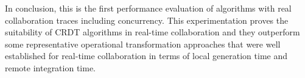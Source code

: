 In conclusion, this is the first performance evaluation of algorithms with real collaboration traces including concurrency. This experimentation proves the suitability of CRDT algorithms in real-time collaboration and they outperform some representative operational transformation approaches that were well established for real-time collaboration in terms of local generation time and remote integration time.
